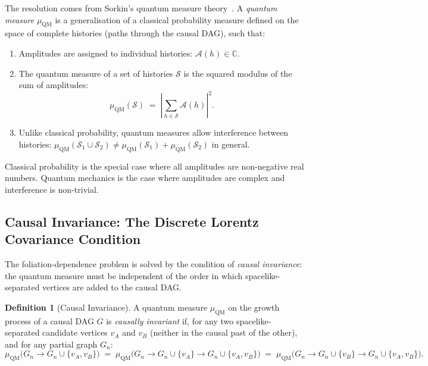 \documentclass[11pt,a4paper]{article}
\theoremstyle{plain}
\theoremstyle{definition}
\newtheorem{definition}[theorem]{Definition}
\theoremstyle{remark}
\newcommand{\muC}{\mu_{\mathrm{QM}}}   %
\begin{document}
The resolution comes from Sorkin's quantum measure theory~\citep{Sorkin1994,
Sorkin2007}. A \emph{quantum measure} $\muC$ is a generalisation of a classical
probability measure defined on the space of complete histories (paths through
the causal DAG), such that:
\begin{enumerate}[noitemsep]
  \item Amplitudes are assigned to individual histories: $\mathcal{A}(h) \in \mathbb{C}$.
  \item The quantum measure of a set of histories $\mathcal{S}$ is the squared
  modulus of the sum of amplitudes:
  \begin{equation}
    \muC(\mathcal{S}) \;=\; \left|\sum_{h \in \mathcal{S}} \mathcal{A}(h)\right|^2.
    \label{eq:quantum_measure}
  \end{equation}
  \item Unlike classical probability, quantum measures allow interference
  between histories: $\muC(\mathcal{S}_1 \cup \mathcal{S}_2) \neq
  \muC(\mathcal{S}_1) + \muC(\mathcal{S}_2)$ in general.
\end{enumerate}
Classical probability is the special case where all amplitudes are
non-negative real numbers. Quantum mechanics is the case where amplitudes
are complex and interference is non-trivial.

\subsection{Causal Invariance: The Discrete Lorentz Covariance Condition}

The foliation-dependence problem is solved by the condition of \emph{causal
invariance}: the quantum measure must be independent of the order in which
spacelike-separated vertices are added to the causal DAG.

\begin{definition}[Causal Invariance]
A quantum measure $\muC$ on the growth process of a causal DAG $G$ is
\emph{causally invariant} if, for any two spacelike-separated candidate
vertices $v_A$ and $v_B$ (neither in the causal past of the other), and
for any partial graph $G_n$:
\begin{equation}
  \muC\bigl(G_n \to G_n \cup \{v_A, v_B\}\bigr)
  \;=\;
  \muC\bigl(G_n \to G_n \cup \{v_A\} \to G_n \cup \{v_A, v_B\}\bigr)
  \;=\;
  \muC\bigl(G_n \to G_n \cup \{v_B\} \to G_n \cup \{v_A, v_B\}\bigr).
  \label{eq:causal_invariance}
\end{equation}
\end{definition}
\end{document}
